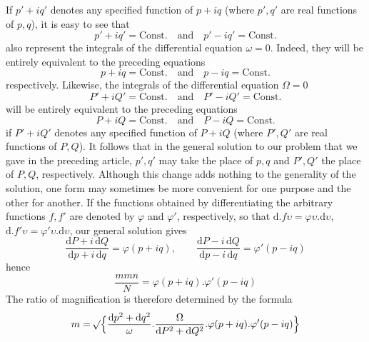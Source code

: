 If \(p'+iq'\) denotes any specified function of \(p+iq\) (where \(p',q'\) are real functions of \(p,q\)), it is easy to see that
\[
p'+iq'=\text{Const.}\quad\text{and}\quad p'-iq'=\text{Const.}
\]
\noindent also represent the integrals of the differential equation \(\omega=0\). Indeed, they will be entirely equivalent to the preceding equations
\[
p+iq=\text{Const.}\quad\text{and}\quad p-iq=\text{Const.}
\]
\noindent respectively. Likewise, the integrals of the differential equation \(\Omega=0\)
\[
P'+iQ'=\text{Const.}\quad\text{and}\quad P'-iQ'=\text{Const.}
\]
\noindent will be entirely equivalent to the preceding equations
\[
P+iQ=\text{Const.}\quad\text{and}\quad P-iQ=\text{Const.}
\]
\noindent if \(P'+iQ'\) denotes any specified function of \(P+iQ\) (where \(P',Q'\) are real functions of \(P,Q\)). It follows that in the general solution to our problem that we gave in the preceding article, \(p',q'\) may take the place of \(p,q\) and \(P',Q'\) the place of \(P,Q\), respectively. Although this change adds nothing to the generality of the solution, one form may sometimes be more convenient for one purpose and the other for another.
If the functions obtained by differentiating the arbitrary functions \(f,f'\) are denoted by \(\varphi\) and \(\varphi'\), respectively, so that \(\mathrm{d}\mathord{.}f\upsilon=\varphi\upsilon\mathord{.}\mathrm{d}\upsilon\), \(\mathrm{d}\mathord{.}f'\upsilon=\varphi'\upsilon\mathord{.}\mathrm{d}\upsilon\), our general solution gives
\[
\frac{\mathrm{d}P+i\,\mathrm{d}Q}{\mathrm{d}p+i\,\mathrm{d}q}=\varphi(p+iq),\qquad
\frac{\mathrm{d}P-i\,\mathrm{d}Q}{\mathrm{d}p-i\,\mathrm{d}q}=\varphi'(p-iq)
\]
\noindent hence
\[
\frac{mmn}{N}=\varphi(p+iq)\mathord{.}\varphi'(p-iq)
\]
\noindent The ratio of magnification is therefore determined by the formula
\[
m=\mathord{{}^{}\!\surd}\Bigl\{\frac{\mathrm{d}p^2+\mathrm{d}q^2}{\omega}\mathord{.}\frac{\Omega}{\mathrm{d}P^2+\mathrm{d}Q^2}\mathord{.}\varphi(p+iq)\mathord{.}\varphi'(p-iq)\Bigr\}
\]

